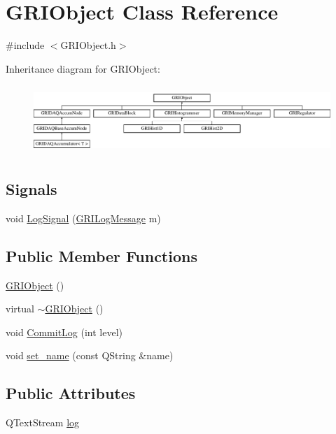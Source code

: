 \hypertarget{classGRIObject}{\section{\-G\-R\-I\-Object \-Class \-Reference}
\label{classGRIObject}
}


{\ttfamily \#include $<$\-G\-R\-I\-Object.\-h$>$}

\-Inheritance diagram for \-G\-R\-I\-Object\-:\begin{figure}[H]
\begin{center}
\leavevmode
\includegraphics[height=2.635294cm]{classGRIObject}
\end{center}
\end{figure}
\subsection*{\-Signals}
\begin{DoxyCompactItemize}
\item 
void \hyperlink{classGRIObject_a0282025db6331a65c0ee359dca6c3cc4}{\-Log\-Signal} (\hyperlink{classGRILogMessage}{\-G\-R\-I\-Log\-Message} m)
\end{DoxyCompactItemize}
\subsection*{\-Public \-Member \-Functions}
\begin{DoxyCompactItemize}
\item 
\hyperlink{classGRIObject_a74b57b4a726ae772acf1b3f7c2712404}{\-G\-R\-I\-Object} ()
\item 
virtual \hyperlink{classGRIObject_a0e88c174c9e2ecb905d4589395ad1493}{$\sim$\-G\-R\-I\-Object} ()
\item 
void \hyperlink{classGRIObject_a0180de0ff6e99dcdaf00010714399670}{\-Commit\-Log} (int level)
\item 
void \hyperlink{classGRIObject_a02373a16902b34f846b8b48d359d0066}{set\-\_\-name} (const \-Q\-String \&name)
\end{DoxyCompactItemize}
\subsection*{\-Public \-Attributes}
\begin{DoxyCompactItemize}
\item 
\-Q\-Text\-Stream \hyperlink{classGRIObject_a891c066215aedc6f77892bd6912c4006}{log}
\end{DoxyCompactItemize}

